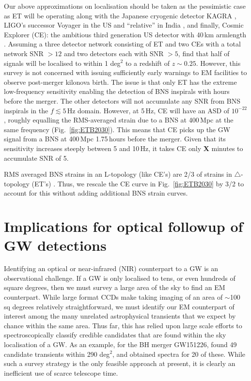 \documentclass{aa}
\begin{document}
Our above approximations on localisation should be taken as the pessimistic case as 
ET will be operating along with the Japanese cryogenic detector KAGRA \citep{Akutsu:2017thy,KAGRA2}, LIGO's successor Voyager in the US \citep{LIGO_Voy} and ``relative'' in India \citep{Unnikrishnan:2013qwa}, 
and finally, Cosmic Explorer (CE): the ambitious third generation US detector with 40\,km armlength \citep{Evans:2016mbw}.  
Assuming a three detector network consisting of ET and two CEs with a total network SNR $> 12$ and two detectors 
each with SNR $> 5$, \cite{Mills:2017urp} find that half of signals will be localised to within 1 deg$^2$ 
to a redshift of $z\sim 0.25$. However, this survey is not concerned with issuing sufficiently early warnings to EM facilities to observe post-merger kilonova birth. The issue is that only ET has the extreme low-frequency sensitivity enabling the detection of BNS inspirals with hours before the merger. 
The other detectors will not accumulate any SNR from BNS inspirals in the $f\lesssim 5\,$Hz domain.
However, at 5\,Hz, CE will have an ASD of $10^{-22}$, roughly equalling the RMS-averaged strain due to a BNS at 400\,Mpc at the same frequency (Fig.~\ref{fig:ETB2030}). 
This means that CE picks up the GW signal from a BNS at 400\,Mpc 1.75\,hours before the merger.
Given that its sensitivity increases steeply between 5 and 10\,Hz, it takes CE only {\bf X} minutes
to accumulate SNR of 5.

RMS averaged BNS strains in an L-topology (like CE's) are 2/3 of strains in $\triangle$-topology (ET's) \citep{Akcay18}.
Thus, we rescale the CE curve in Fig.~\ref{fig:ETB2030} by 3/2 to account for this without adding additional BNS strain curves.




\section{Implications for optical followup of GW detections} \label{sect:EM}
Identifying an optical or near-infrared (NIR) counterpart to a GW is an observational challenge. If a GW is only localised to tens, or even hundreds of square degrees, then we must survey a large area of the sky to find an EM counterpart. While large format CCDs make taking imaging of an area of $\sim$100 sq degrees relatively straightforward, we must identify our EM counterpart of interest among the many unrelated astrophysical transients that we expect by chance within the same area. Thus far, this has relied upon large scale efforts to spectroscopically classify credible candidates that are found within the sky localisation of a GW. As an example, for the BH merger GW151226, \cite{Smar16} found 49 candidate transients within 290 deg$^2$, and obtained spectra for 20 of these. While such a survey strategy is the only feasible approach at present, it is clearly an inefficient use of scarce telescope time.
\end{document}
